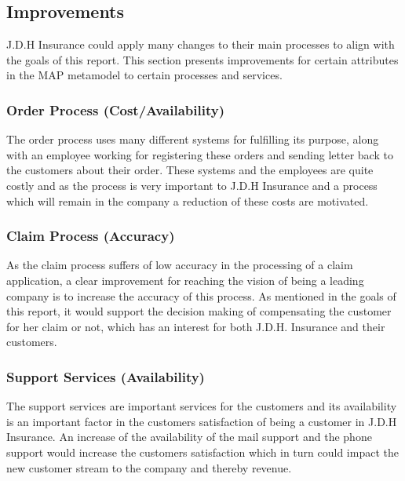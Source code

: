 %
\subsection{Improvements}
\label{sec:improvements}
J.D.H Insurance could apply many changes to their main processes to align with the goals of this report. This section presents improvements for certain attributes in the MAP metamodel to certain processes and services.
\subsubsection{Order Process (Cost/Availability)}
The order process uses many different systems for fulfilling its purpose, along with an employee working for registering these orders and sending letter back to the customers about their order. These systems and the employees are quite costly and as the process is very important to J.D.H Insurance and a process which will remain in the company a reduction of these costs are motivated.
\subsubsection{Claim Process (Accuracy)}
As the claim process suffers of low accuracy in the processing of a claim application, a clear improvement for reaching the vision of being a leading company is to increase the accuracy of this process. As mentioned in the goals of this report, it would support the decision making of compensating the customer for her claim or not, which has an interest for both J.D.H. Insurance and their customers.
\subsubsection{Support Services (Availability)}
The support services are important services for the customers and its availability is an important factor in the customers satisfaction of being a customer in J.D.H Insurance. An increase of the availability of the mail support and the phone support would increase the customers satisfaction which in turn could impact the new customer stream to the company and thereby revenue.